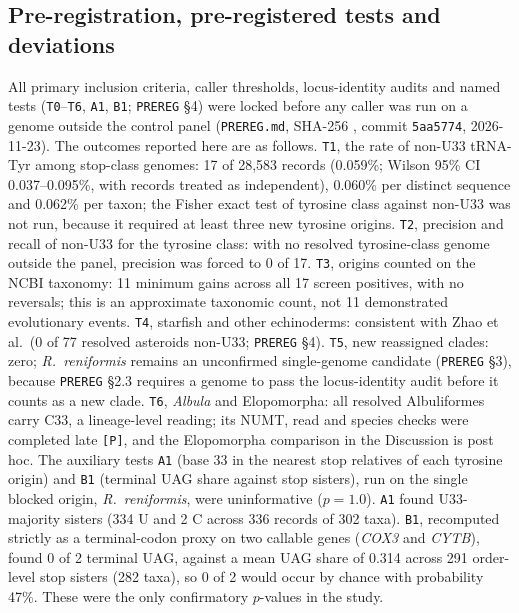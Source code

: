\documentclass[11pt, a4paper]{article}
\begin{document}
\subsection{Pre-registration, pre-registered tests and deviations}
All primary inclusion criteria, caller thresholds, locus-identity audits and named tests (\texttt{T0}--\texttt{T6}, \texttt{A1}, \texttt{B1}; \texttt{PREREG} \S 4) were locked before any caller was run on a genome outside the control panel (\texttt{PREREG.md}, SHA-256 \texttt{}, commit \texttt{5aa5774}, 2026-11-23). The outcomes reported here are as follows. \texttt{T1}, the rate of non-U33 tRNA-Tyr among stop-class genomes: 17 of 28,583 records (0.059\%; Wilson 95\% CI 0.037--0.095\%, with records treated as independent), 0.060\% per distinct sequence and 0.062\% per taxon; the Fisher exact test of tyrosine class against non-U33 was not run, because it required at least three new tyrosine origins. \texttt{T2}, precision and recall of non-U33 for the tyrosine class: with no resolved tyrosine-class genome outside the panel, precision was forced to 0 of 17. \texttt{T3}, origins counted on the NCBI taxonomy: 11 minimum gains across all 17 screen positives, with no reversals; this is an approximate taxonomic count, not 11 demonstrated evolutionary events. \texttt{T4}, starfish and other echinoderms: consistent with Zhao et al.\ (0 of 77 resolved asteroids non-U33; \texttt{PREREG} \S 4). \texttt{T5}, new reassigned clades: zero; \textit{R.\ reniformis} remains an unconfirmed single-genome candidate (\texttt{PREREG} \S 3), because \texttt{PREREG} \S 2.3 requires a genome to pass the locus-identity audit before it counts as a new clade. \texttt{T6}, \textit{Albula} and Elopomorpha: all resolved Albuliformes carry C33, a lineage-level reading; its NUMT, read and species checks were completed late \texttt{[P]}, and the Elopomorpha comparison in the Discussion is post hoc. The auxiliary tests \texttt{A1} (base 33 in the nearest stop relatives of each tyrosine origin) and \texttt{B1} (terminal UAG share against stop sisters), run on the single blocked origin, \textit{R.\ reniformis}, were uninformative ($p = 1.0$). \texttt{A1} found U33-majority sisters (334 U and 2 C across 336 records of 302 taxa). \texttt{B1}, recomputed strictly as a terminal-codon proxy on two callable genes (\textit{COX3} and \textit{CYTB}), found 0 of 2 terminal UAG, against a mean UAG share of 0.314 across 291 order-level stop sisters (282 taxa), so 0 of 2 would occur by chance with probability 47\%. These were the only confirmatory $p$-values in the study.
\end{document}
